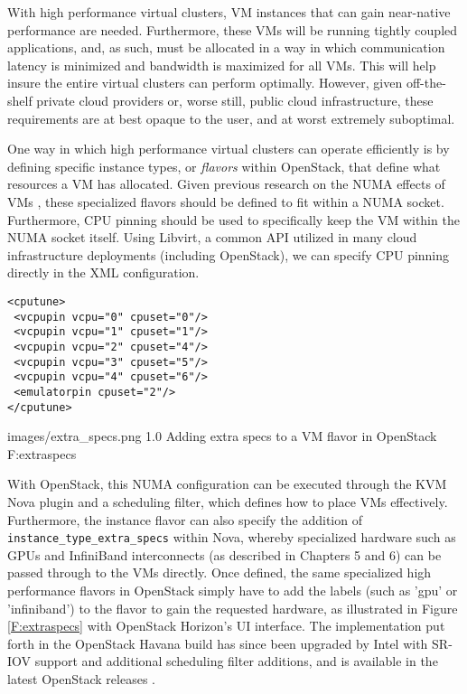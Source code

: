 With high performance virtual clusters, VM instances that can gain near-native performance are needed. Furthermore, these VMs will be running tightly coupled applications, and, as such, must be allocated in a way in which communication latency is minimized and bandwidth is maximized for all VMs. This will help insure the entire virtual clusters can perform optimally.  However, given off-the-shelf private cloud providers or, worse still, public cloud infrastructure, these requirements are at best opaque to the user, and at worst extremely suboptimal.

One way in which high performance virtual clusters can operate efficiently is by defining specific instance types, or \emph{flavors} within OpenStack, that define what resources a VM has allocated.  Given previous research on the NUMA effects of VMs \cite{openstack-numa}, these specialized flavors should be defined to fit within a NUMA socket.  Furthermore, CPU pinning should be used to specifically keep the VM within the NUMA socket itself.  Using Libvirt, a common API utilized in many cloud infrastructure deployments (including OpenStack), we can specify CPU pinning directly in the XML configuration.

\begin{verbatim}
<cputune>
 <vcpupin vcpu="0" cpuset="0"/>
 <vcpupin vcpu="1" cpuset="1"/>
 <vcpupin vcpu="2" cpuset="4"/>
 <vcpupin vcpu="3" cpuset="5"/>
 <vcpupin vcpu="4" cpuset="6"/>
 <emulatorpin cpuset="2"/>
</cputune>
\end{verbatim}

  {images/extra_specs.png}
  {1.0}
  {Adding extra specs to a VM flavor in OpenStack}
  {F:extraspecs}

With OpenStack, this NUMA configuration can be executed through the KVM Nova plugin and a scheduling filter, which defines how to place VMs effectively. Furthermore, the instance flavor can also specify the addition of \\\verb!instance_type_extra_specs! within Nova, whereby specialized hardware such as GPUs and InfiniBand interconnects (as described in Chapters 5 and 6) can be passed through to the VMs directly. Once defined, the same specialized high performance flavors in OpenStack simply have to add the labels (such as 'gpu' or 'infiniband') to the flavor to gain the requested hardware, as illustrated in Figure \ref{F:extraspecs} with OpenStack Horizon's UI interface.  The implementation put forth in the OpenStack Havana build has since been upgraded by Intel with SR-IOV support and additional scheduling filter additions, and is available in the latest OpenStack releases \cite{jiang2015}. 

